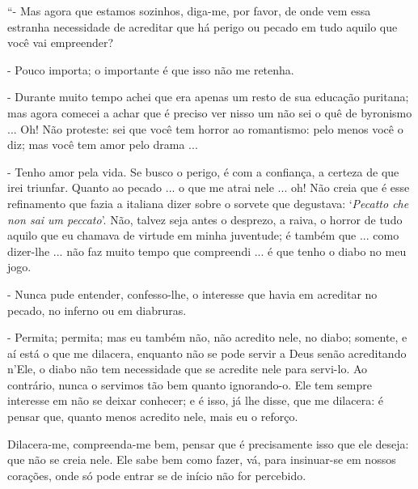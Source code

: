 ``- Mas agora que estamos sozinhos, diga-me, por favor, de onde vem essa
estranha necessidade de acreditar que há perigo ou pecado em tudo aquilo
que você vai empreender?

- Pouco importa; o importante é que isso não me retenha.

- Durante muito tempo achei que era apenas um resto de sua educação
puritana; mas agora comecei a achar que é preciso ver nisso um não sei o
quê de byronismo ... Oh! Não proteste: sei que você tem horror ao
romantismo: pelo menos você o diz; mas você tem amor pelo drama ...

- Tenho amor pela vida. Se busco o perigo, é com a confiança, a certeza
de que irei triunfar. Quanto ao pecado ... o que me atrai nele ... oh!
Não creia que é esse refinamento que fazia a italiana dizer sobre o
sorvete que degustava: `\emph{Pecatto che non sai um peccato}'. Não,
talvez seja antes o desprezo, a raiva, o horror de tudo aquilo que eu
chamava de virtude em minha juventude; é também que ... como dizer-lhe
... não faz muito tempo que compreendi ... é que tenho o diabo no meu
jogo.

- Nunca pude entender, confesso-lhe, o interesse que havia em acreditar
no pecado, no inferno ou em diabruras.

- Permita; permita; mas eu também não, não acredito nele, no diabo;
somente, e aí está o que me dilacera, enquanto não se pode servir a Deus
senão acreditando n'Ele, o diabo não tem necessidade que se acredite
nele para servi-lo. Ao contrário, nunca o servimos tão bem quanto
ignorando-o. Ele tem sempre interesse em não se deixar conhecer; e é
isso, já lhe disse, que me dilacera: é pensar que, quanto menos acredito
nele, mais eu o reforço.

Dilacera-me, compreenda-me bem, pensar que é precisamente isso que ele
deseja: que não se creia nele. Ele sabe bem como fazer, vá, para
insinuar-se em nossos corações, onde só pode entrar se de início não for
percebido.

